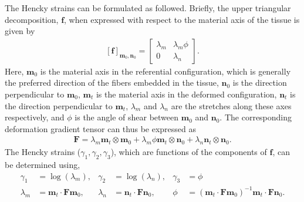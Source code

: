     
    The Hencky strains can be formulated as followed. Briefly, the upper triangular decomposition, $\mathbf{f}$, when expressed with respect to the material axis of the tissue is given by
\begin{equation}
\begin{aligned}
\left[\mathbf{f}\right]_{\mathbf{m}_0,\mathbf{n}_0} = \begin{bmatrix}
\lambda_m 	& \lambda_m\phi \\
0			& \lambda_n
\end{bmatrix}.
\end{aligned}\label{eqn:uppertriangulardecomposition}
\end{equation}
    Here, $\mathbf{m}_0$ is the material axis in the referential configuration, which is generally the preferred direction of the fibers embedded in the tissue, $\mathbf{n}_0$ is the direction perpendicular to $\mathbf{m}_0$, $\mathbf{m}_t$ is the material axis in the deformed configuration, $\mathbf{n}_t$ is the direction perpendicular to $\mathbf{m}_t$, $\lambda_m$ and $\lambda_n$ are the stretches along these axes respectively, and $\phi$ is the angle of shear between $\mathbf{m}_0$ and $\mathbf{n}_0$. The corresponding deformation gradient tensor can thus be expressed as 
\begin{equation}
\begin{aligned}
\mathbf{F} = \lambda_m\mathbf{m}_t\otimes\mathbf{m}_0 + \lambda_m\phi\mathbf{m}_t\otimes\mathbf{n}_0 + \lambda_n\mathbf{n}_t\otimes\mathbf{n}_0.
\end{aligned}
\end{equation}
    The Hencky strains ($\gamma_1, \gamma_2, \gamma_3$), which are functions of the components of $\mathbf{f}$, can be determined using, 
\begin{subequations}\label{eqn:henckystrains}
\begin{align}
\gamma_1 &= \log(\lambda_m), &	\gamma_2 &= \log(\lambda_n), 	& \gamma_3 &= \phi	\\
\lambda_m &= \mathbf{m}_t\cdot\mathbf{F}\mathbf{m}_0, &	\lambda_n &= \mathbf{n}_t\cdot\mathbf{F}\mathbf{n}_0,	&	\phi &= \left(\mathbf{m}_t\cdot\mathbf{F}\mathbf{m}_0\right)^{-1}\mathbf{m}_t\cdot\mathbf{F}\mathbf{n}_0.
\end{align}
\end{subequations}
    
